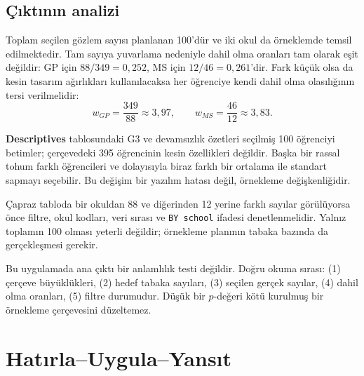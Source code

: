 \subsection{Çıktının analizi}

Toplam seçilen gözlem sayısı planlanan 100'dür ve iki okul da örneklemde
temsil edilmektedir. Tam sayıya yuvarlama nedeniyle dahil olma oranları tam
olarak eşit değildir: GP için $88/349=0{,}252$, MS için
$12/46=0{,}261$'dir. Fark küçük olsa da kesin tasarım ağırlıkları kullanılacaksa
her öğrenciye kendi dahil olma olasılığının tersi verilmelidir:
\[
w_{GP}=\frac{349}{88}\approx3{,}97,
\qquad
w_{MS}=\frac{46}{12}\approx3{,}83.
\]

\textbf{Descriptives} tablosundaki G3 ve devamsızlık özetleri seçilmiş 100
öğrenciyi betimler; çerçevedeki 395 öğrencinin kesin özellikleri değildir.
Başka bir rassal tohum farklı öğrencileri ve dolayısıyla biraz farklı bir
ortalama ile standart sapmayı seçebilir. Bu değişim bir yazılım hatası değil,
örnekleme değişkenliğidir.

Çapraz tabloda bir okuldan 88 ve diğerinden 12 yerine farklı sayılar
görülüyorsa önce filtre, okul kodları, veri sırası ve \texttt{BY school}
ifadesi denetlenmelidir. Yalnız toplamın 100 olması yeterli değildir; örnekleme
planının tabaka bazında da gerçekleşmesi gerekir.

\begin{outputguidebox}
Bu uygulamada ana çıktı bir anlamlılık testi değildir. Doğru okuma sırası:
(1) çerçeve büyüklükleri, (2) hedef tabaka sayıları, (3) seçilen gerçek
sayılar, (4) dahil olma oranları, (5) filtre durumudur. Düşük bir $p$-değeri
kötü kurulmuş bir örnekleme çerçevesini düzeltemez.
\end{outputguidebox}




\section*{Hatırla--Uygula--Yansıt}

